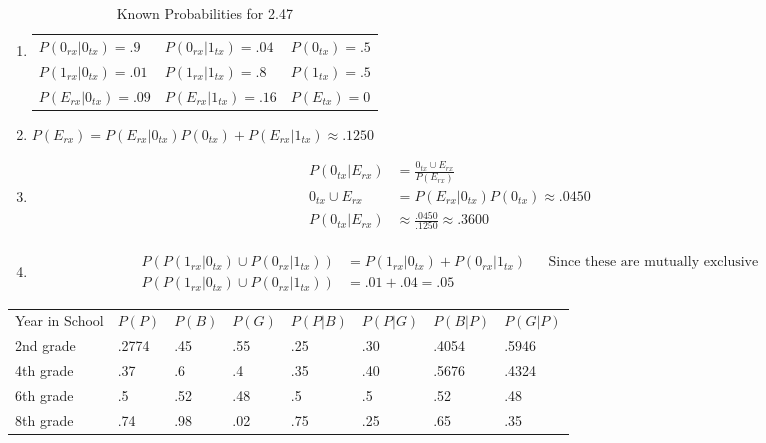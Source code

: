\documentclass[12pt]{article}
\newenvironment{problem}[2][Problem]{\begin{trivlist}
\item[\hskip \labelsep {\bfseries #1}\hskip \labelsep {\bfseries #2.}]
  \vspace{1 cm}
}{\end{trivlist}}
\begin{document}
\begin{problem}{2.47}
\item
  \begin{enumerate}
    \item %
      \begin{table}[!htpb]
        \centering
          \caption{Known Probabilities for 2.47}
          \label{probs_2_4}
            \begin{tabular}{lll}
              $P(0_{rx}|0_{tx}) = .9$  & $P(0_{rx}|1_{tx}) = .04$ & $P(0_{tx}) = .5$ \\
              $P(1_{rx}|0_{tx}) = .01$ & $P(1_{rx}|1_{tx}) = .8$  & $P(1_{tx}) = .5$ \\
              $P(E_{rx}|0_{tx}) = .09$ & $P(E_{rx}|1_{tx}) = .16$ & $P(E_{tx}) = 0$ 
            \end{tabular}
      \end{table}
    \item %
      $P(E_{rx}) = P(E_{rx}|0_{tx})P(0_{tx}) + P(E_{rx}|1_{tx}) \approx .1250$
    \item %
      \begin{align*}
        P(0_{tx}|E_{rx}) &= \frac{0_{tx} \cup E_{rx}}{P(E_{rx})} \\
        0_{tx} \cup E_{rx} &= P(E_{rx}|0_{tx})P(0_{tx}) \approx .0450 \\
        P(0_{tx}|E_{rx}) &\approx \frac{.0450}{.1250} \approx .3600 \\
      \end{align*}
    \item %
      \begin{align*}
        P(P(1_{rx}|0_{tx})\cup P(0_{rx}|1_{tx})) &= P(1_{rx}|0_{tx}) + P(0_{rx}|1_{tx}) & & \textrm{Since these are mutually exclusive} \\
        P(P(1_{rx}|0_{tx})\cup P(0_{rx}|1_{tx})) &= .01 + .04 = .05 
      \end{align*}
  \end{enumerate}
\end{problem}

\begin{problem}{2.49}
\item
  \begin{table}[!htbp]
    \centering
    \begin{tabular}{llllllll}
      Year in School & $P(P)$ & $P(B)$ & $P(G)$ & $P(P|B)$ & $P(P|G)$ & $P(B|P)$ & $P(G|P)$ \\
      2nd grade      & .2774  & .45    & .55    & .25      & .30      & .4054    & .5946    \\
      4th grade      & .37    & .6     & .4     & .35      & .40      & .5676    & .4324    \\
      6th grade      & .5     & .52    & .48    & .5       & .5       & .52      & .48      \\
      8th grade      & .74    & .98    & .02    & .75      & .25      & .65      & .35     
    \end{tabular}
  \end{table}
\end{problem}
\end{document}

